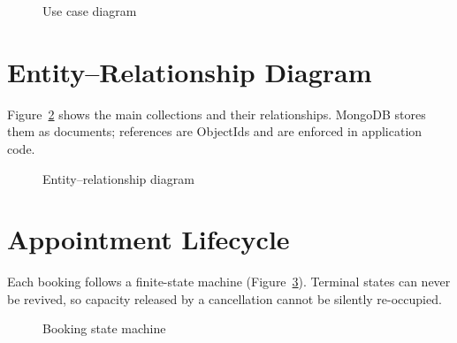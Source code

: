 \begin{figure}[!htbp]
\centering

\caption{Use case diagram}
\label{fig:usecase}
\end{figure}

\section{Entity--Relationship Diagram}
Figure~\ref{fig:er} shows the main collections and their relationships. MongoDB stores them as documents; references are ObjectIds and are enforced in application code.

\begin{figure}[!htbp]
\centering

\caption{Entity--relationship diagram}
\label{fig:er}
\end{figure}

\section{Appointment Lifecycle}
Each booking follows a finite-state machine (Figure~\ref{fig:states}). Terminal states can never be revived, so capacity released by a cancellation cannot be silently re-occupied.

\begin{figure}[!htbp]
\centering

\caption{Booking state machine}
\label{fig:states}
\end{figure}

